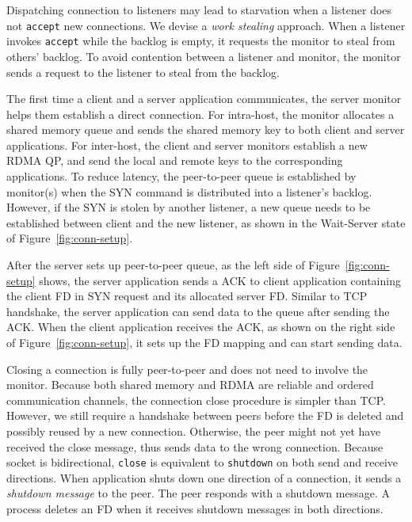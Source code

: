 Dispatching connection to listeners may lead to starvation when a listener does not \texttt{accept} new connections.
We devise a \textit{work stealing} approach.
When a listener invokes \texttt{accept} while the backlog is empty, it requests the monitor to steal from others' backlog.
To avoid contention between a listener and monitor, the monitor sends a request to the listener to steal from the backlog.

The first time a client and a server application communicates, the server monitor helps them establish a direct connection.
For intra-host, the monitor allocates a shared memory queue and sends the shared memory key to both client and server applications.
For inter-host, the client and server monitors establish a new RDMA QP, and send the local and remote keys to the corresponding applications.
To reduce latency, the peer-to-peer queue is established by monitor(s) when the SYN command is distributed into a listener's backlog.
However, if the SYN is stolen by another listener, a new queue needs to be established between client and the new listener, as shown in the Wait-Server state of Figure~\ref{fig:conn-setup}.

After the server sets up peer-to-peer queue, as the left side of Figure~\ref{fig:conn-setup} shows, the server application sends a ACK to client application containing the client FD in SYN request and its allocated server FD.
Similar to TCP handshake, the server application can send data to the queue after sending the ACK.
When the client application receives the ACK, as shown on the right side of Figure~\ref{fig:conn-setup}, it sets up the FD mapping and can start sending data.




Closing a connection is fully peer-to-peer and does not need to involve the monitor.
Because both shared memory and RDMA are reliable and ordered communication channels, the connection close procedure is simpler than TCP.
However, we still require a handshake between peers before the FD is deleted and possibly reused by a new connection.
Otherwise, the peer might not yet have received the close message, thus sends data to the wrong connection.
Because socket is bidirectional, \texttt{close} is equivalent to \texttt{shutdown} on both send and receive directions.
When application shuts down one direction of a connection, it sends a \emph{shutdown message} to the peer.
The peer responds with a shutdown message.
A process deletes an FD when it receives shutdown messages in both directions.



